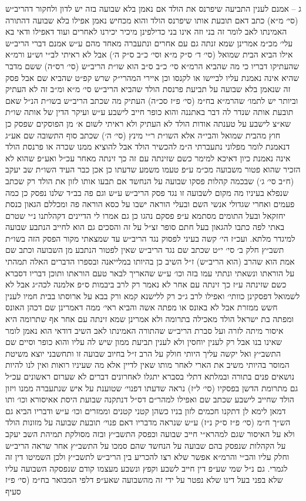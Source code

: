 \documentclass[12pt, openany]{book}
\begin{document}
\begin{multicols}{2}
ג – אמנם לענין התביעה שיפרנס את הולד אם נאמן בלא שבועה בזה יש לדון ולחקור דהריב״ש (סי׳ מ״א) כתב דאם תובעת אותו שיפרנס הולד והוא מכחיש נאמן אפילו בלא שבועה דהתורה האמינתו לאב לומר זה בני וזה אינו בני כדילפינן מיכיר יכירנו לאחרים ועוד דאפילו ודאי בא עלי׳ מכ״מ אמרינן שמא זנתה גם עם אחרים ונתעברה מאחד מהם ע״ש אמנם דברי הריב״ש אילו הביא הבית שמואל (סי׳ ד׳ ס״ק מ״א וסי׳ כ״ב ס״ק ה׳) אבל לא ראיתי לב״י וש״ע ורמ״א שהעתיקו דבריו כי מה שהביא הרמ״א סי׳ כ״ב ס״ב הוא שו״ת הריב״ש (סי׳ רס״ה) ששם מדבר שהיא אינה נאמנת עליו לביישו או לקנסו וכן איירי המהרי״ק שרש קפ״ט שהביא שם אבל פסק זה שנאמן בלא שבועה על תביעת פרנסת הולד שהביא הריב״ש סי׳ מ״א ומ״ב זה לא העתיק וביותר יש לתמו׳ שהרמ״א בח״מ (סי׳ פ״ז סכ״ה) העתיק מה שכתב הריב״ש בשו״ת הנ״ל שאם תובעת אותה שנדר לה דבר באתננה והוא כופר חייב לישבע ע״ש ועיקר הדין של אותה שו״ת שא״צ לישבע על טענתה אודות הולד לא העתיק ולא ראיתי לשום א׳ מן הפוסקים שפסק כן חוץ מהבית שמואל והבי״ה אלא השו״ת ר״י מינץ (סי׳ ה׳) שכתב סוף התשובה שם אע״ג דנאמנת לומר מפלוני נתעברתי ה״מ להכשיר הולד אבל להוציא ממנו שכרה או פרנסת הולד אינה נאמנת כיון דאיכא למימר כשם שזינתה עם זה כך זינתה מאחר עכ״ל ואע״פ שהוא לא הזכיר שהוא פטור משבועה מכ״מ ע״פ טעמו משמע שדעתו כן אכן כבר העיד השו״ת שב יעקב (ח״ב סי׳ ג׳) שבכמה קהלות פסקו שבועה על הנחשד אם תבעו אותו לזון את הולד רק שכתב שנפלא בעיניו מה מקום לשבועה זו נגד פסק הריב״ש ע״ש וגם פה בב״ד שלנו נפסק כן כמה פעמים ואחרי שגדולי אנשי השם ובעלי הוראה ישבו על כסא הוראה פה ומכללם הגאון כנסת יחזקאל ובעל התומים מסתמא ע״פ פסקם נהגו כן גם אמרו לי הדיינים דקהלתנו נ״י שטרם באתי לפה כתבו להגאון בעל חתם סופר זצ״ל על זה והסכים גם הוא לחייב הנתבע שבועה למיגדר מלתא. ועכ״ז הי׳ קשה בעיני לפסוק נגד הריב״ש עד שמצאתי מקור הפסק הזה בשו״ת תשב״ץ חלק ב׳ סי׳ י״ט שכתב שם נגד הריב״ש שאין לפטור הנתבע מן השבועה וכתב שם אמת הוא שהרב (הוא הריב״ש) ז״ל השיב כן בהיותו במלייאנה ובספרו הדברים האלה תמהתי על הוראתו ונשאתי ונתתי עמו בזה וכו׳ ע״ש שהאריך לבאר טעם הוראתו ותוכן דבריו דסברא כשם שזינתה ע״ז כך זינתה עם אחר לא נאמר רק לרב ביבמות ס״פ אלמנה לכה״ג אבל לא לשמואל דפסקינן כוותי׳ ואפילו לרב ג״כ רק ללישנא קמא ורק בבא על ארוסתו בבית חמיו לענין חשש ממזרת אבל לא באונס או מפתה אשה והביא ראי׳ ממה דאמרינן שם דכהן האונס ומפתה בת ישראל הולד מאכילה בתרומה ולא אמרינן שמא זינתה עם אחר אף שתרומה היא איסור מיתה לזרה ועל סברת הריב״ש שהתורה האמינתו לאב השיב דודאי הוא נאמן לומר שאינו בנו אבל רק לענין יוחסין ולא לענין תביעת ממון שיש לה עליו והוא כופר וסיים שם התשב״ץ ואל יקשה עליך היותי חולק על הרב ז״ל בחיוב שבועה זו ותחשבני יוצא משיטת המוסר בהיותי משיב את הארי לאחר מותו שאין לדיין אלא מה שעיניו רואות ואין לנו להיות נושאים פנים בתורה ובמלתא דתלי בסברא יתגלו לאחרונים דברים לא שערום ראשונים עכ״ל גם מתרומת הדשן בפסקיו (סי׳ ל״ז) נראה שדעתו דפנוי׳ שטוענת על איש שנתעברה ממנו ויזון הולד שחייב לישבע שכתב שם ואפילו למהר״ם דס״ל דנתקנה שבועת היסת אאיסורא וכו׳ ותו דמאן לימא לן דתקנו חכמים לזון בניו כשהן קטני קטנים וממזרים וכו׳ ע״ש ודבריו הביא גם הש״ך ח״מ (סי׳ פ״ז ס״ק נ״ז) ע״ש שנראה מדבריו דאם פנוי׳ תובעת שבועה על מזונות הולד ולא על האיסור שגם למהרא״י חייב שבועה וכפסק התשב״ץ ובזה מסולקת תמיהת השב יעקב על הקהלות שנפסק בהם שבועה על הנחשד שהם סמכו על התשב״ץ אחר שראה הריב״ש וחלק עליו והב״י והרמ״א אפשר שלא רצו להכריע בין הריב״ש לתשב״ץ ולכן השמיטו דין זה לגמרי. גם נ״ל שמי שע״פ דין חייב לשבע וקפץ ונשבע מעצמו קודם שנפסקה השבועה עליו שלא בפני בעל דינו שלא נפטר על ידי זה מהשבועה שאע״פ דלפי המבואר בח״מ (סי׳ פ״ז סעיף 
\end{multicols}
\end{document}

